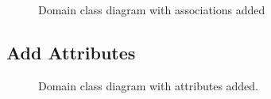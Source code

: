 \documentclass[12pt]{article}
\begin{document}
    \begin{figure}[H]
        \centering
        
        \caption{Domain class diagram with associations added}
        \label{fig:dmWithAss}
    \end{figure}

    \subsection{Add Attributes}

    \begin{figure}[H]
        \centering
        
        \caption{Domain class diagram with attributes added.}
        \label{fig:dmWithAssAndAtt}
    \end{figure}



\end{document}
